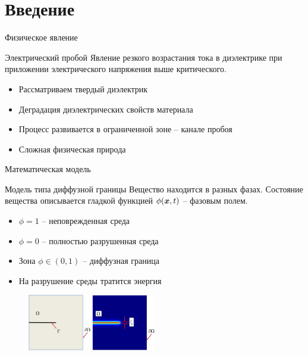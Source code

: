 
\section{Введение}

\begin{frame}{Физическое явление}
\begin{block}{Электрический пробой}
	Явление резкого возрастания тока в диэлектрике при приложении электрического напряжения выше критического.
\end{block}
\begin{itemize}
	\item Рассматриваем твердый диэлектрик
	\item Деградация диэлектрических свойств материала
	\item Процесс развивается в ограниченной зоне -- канале пробоя
	\item Сложная физическая природа
\end{itemize}
\end{frame}


\begin{frame}{Математическая модель}
\begin{block}{Модель типа диффузной границы}
	Вещество находится в разных фазах. Состояние вещества описывается гладкой функцией $\phi({\boldsymbol{x}}, t)$ -- фазовым полем.
\end{block}
\begin{itemize}
	\item $\phi = 1$ -- неповрежденная среда
	\item $\phi = 0$ -- полностью разрушенная среда
	\item Зона $\phi \in (0, 1)$ -- диффузная граница
	\item На разрушение среды тратится энергия
\end{itemize}
\begin{figure}
	\includegraphics[width=0.5\textwidth]{figures/diffuse_edge.jpg}
\end{figure}
\end{frame}


